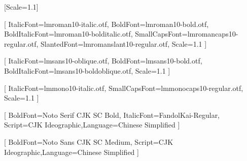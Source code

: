 \usepackage{xltxtra,xunicode}

\usepackage{textcomp} %




\newfontfamily{}[Scale=1.1]

\setmainfont{lmroman10-regular.otf}[
  ItalicFont=lmroman10-italic.otf,
  BoldFont=lmroman10-bold.otf,
  BoldItalicFont=lmroman10-bolditalic.otf,
  SmallCapsFont=lmromancaps10-regular.otf,
  SlantedFont=lmromanslant10-regular.otf,
  Scale=1.1
]

\setsansfont{lmsans10-regular.otf}[
  ItalicFont=lmsans10-oblique.otf,
  BoldFont=lmsans10-bold.otf,
  BoldItalicFont=lmsans10-boldoblique.otf,
  Scale=1.1
]

\setmonofont{lmmono10-regular.otf}[
  ItalicFont=lmmono10-italic.otf,
  SmallCapsFont=lmmonocaps10-regular.otf,
  Scale=1.1
]

[
  BoldFont=Noto Serif CJK SC Bold,
  ItalicFont=FandolKai-Regular,
  Script=CJK Ideographic,Language=Chinese Simplified
]


[
  BoldFont=Noto Sans CJK SC Medium,
  Script=CJK Ideographic,Language=Chinese Simplified
]



\usepackage{etoolbox} %

\makeatletter
\newcommand*\original@CJKsymbol{}
\newcommand*\original@CJKpunctsymbol{}
\let\original@CJKsymbol\CJKsymbol
\let\original@CJKpunctsymbol\CJKpunctsymbol
\newcommand*\raise@Fandol@CJK[1]{\raise0.08\ccwd\hbox{#1}}
\appto\itshape{%
  \let\CJKsymbol\raise@Fandol@CJK
  \let\CJKpunctsymbol\raise@Fandol@CJK
}
\appto\kaishu{%
  \let\CJKsymbol\raise@Fandol@CJK
  \let\CJKpunctsymbol\raise@Fandol@CJK
}
\appto\fangsong{%
  \let\CJKsymbol\raise@Fandol@CJK
  \let\CJKpunctsymbol\raise@Fandol@CJK
}
\appto\upshape{%
  \let\CJKsymbol\original@CJKsymbol
  \let\CJKpunctsymbol\original@CJKpunctsymbol
}
\appto\reset@font{%
  \let\CJKsymbol\original@CJKsymbol
  \let\CJKpunctsymbol\original@CJKpunctsymbol
}
\makeatother


